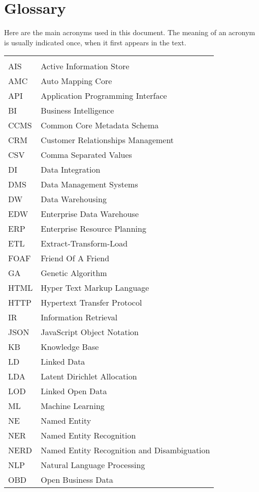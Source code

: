 \chapter*{Glossary}

Here are the main acronyms used in this document. The meaning of an acronym is usually indicated once, when it first appears in the text.

\begin{longtable}{lp{9cm}}
 &\\
 AIS & Active Information Store \\
 AMC & Auto Mapping Core \\
 API  & Application Programming Interface \\
 BI & Business Intelligence\\
 CCMS & Common Core Metadata Schema \\
 CRM & Customer Relationships Management\\
 CSV & Comma Separated Values\\
 DI & Data Integration \\
 DMS & Data Management Systems\\
 DW & Data Warehousing \\
 EDW & Enterprise Data Warehouse \\
 ERP &  Enterprise Resource Planning\\
 ETL & Extract-Transform-Load \\
 FOAF & Friend Of A Friend \\
 GA & Genetic Algorithm \\
 HTML &   Hyper Text Markup Language\\
 HTTP & Hypertext Transfer Protocol \\
 IR & Information Retrieval \\
 JSON & JavaScript Object Notation \\
 KB & Knowledge Base \\
 LD & Linked Data\\
 LDA & Latent Dirichlet Allocation \\
 LOD & Linked Open Data \\
 ML & Machine Learning \\
 NE & Named Entity \\
 NER & Named Entity Recognition\\
 NERD & Named Entity Recognition and Disambiguation \\
 NLP & Natural Language Processing \\
 OBD & Open Business Data\\

\end{longtable}
